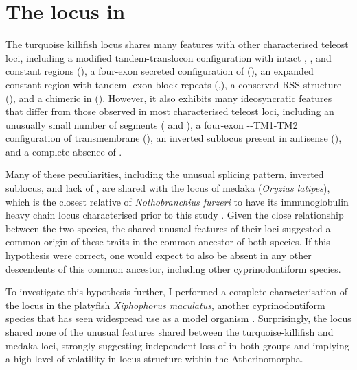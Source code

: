 \FloatBarrier
\clearpage


\section{The \igh{} locus in \xma}
\label{sec:xma-locus}
	
	The turquoise killifish \igh{} locus shares many features with other characterised teleost loci, including a modified tandem-translocon configuration with intact \vh, \dh, \jh and constant regions (), a four-exon secreted configuration of  (), an expanded  constant region with tandem \cd{}-exon block repeats (,), a conserved RSS structure (), and a chimeric  in  (). However, it also exhibits many ideosyncratic features that differ from those observed in most characterised teleost loci, including an unusually small number of \vh segments ( and ), a four-exon --TM1-TM2 configuration of transmembrane  (), an inverted sublocus present in antisense (), and a complete absence of .
	
Many of these peculiarities, including the unusual  splicing pattern, inverted sublocus, and lack of , are shared with the \igh{} locus of medaka (\textit{Oryzias latipes}), which is the closest relative of \textit{Nothobranchius furzeri} to have its immunoglobulin heavy chain locus characterised prior to this study \parencite{magadan2011medaka}. Given the close relationship between the two species, the shared unusual features of their \igh{} loci suggested a common origin of these traits  in the common ancestor of both species. If this hypothesis were correct, one would expect  to also be absent in any other descendents of this common ancestor, including other cyprinodontiform species.

To investigate this hypothesis further, I performed a complete characterisation of the \igh{} locus in the platyfish \textit{Xiphophorus maculatus}, another cyprinodontiform species that has seen widespread use as a model organism \parencite{schartl2013platyfish}. Surprisingly, the \Xma locus shared none of the unusual features shared between the turquoise-killifish and medaka loci, strongly suggesting independent loss of  in both groups and implying a high level of volatility in \igh{} locus structure within the Atherinomorpha.

